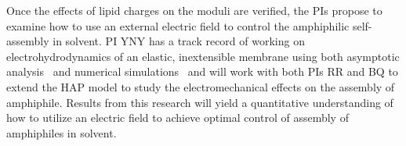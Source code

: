 Once the effects of lipid charges on the moduli are verified, the PIs
propose to examine how to use an external electric field to control the
amphiphilic self-assembly in solvent. PI YNY has a track record of
working on electrohydrodynamics of an elastic, inextensible membrane
using both asymptotic analysis~\cite{Nganguia2013_PRE, Young2014_JFM,
Young2015_PoF} and numerical simulations~\cite{Nganguia2015_CiCP} and
will work with both PIs RR and BQ to extend the HAP model to study the
electromechanical effects on the assembly of amphiphile. Results from
this research will yield a quantitative understanding of how to utilize
an electric field to achieve optimal control of assembly of amphiphiles
in solvent.




